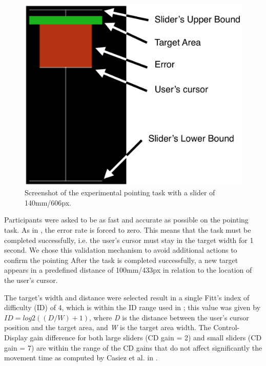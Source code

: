 \documentclass{sigchi}
\begin{document}
\begin{figure}[h]
\centering
  \includegraphics[width=0.7\columnwidth]{figures/slidertask}
  \caption{Screenshot of the experimental pointing task with a slider of 140mm/606px.}
  \label{fig:figure4}
\end{figure}

Participants were asked to be as fast and accurate as possible on the pointing task. As in \cite{Coutrix2015}, the error rate is forced to zero. This means that the task must be completed successfully, i.e. the user’s cursor must stay in the target width for 1 second. We chose this validation mechanism to avoid additional actions to confirm the pointing \cite{Zhang:2012:MDE:2212776.2223704} After the task is completed successfully, a new target appears in a predefined distance of 100mm/433px in relation to the location of the user’s cursor.

The target’s width and distance were selected result in a single Fitt’s index of difficulty  (ID) of 4, which is within the ID range used in \cite{Casiez08theimpact}; this value was given by $ID = log2((D/W)+1)$, where \textit{D} is the distance between the user’s cursor position and the target area, and \textit{W} is the target area width. The Control-Display gain difference for both large sliders (CD gain = 2) and small sliders (CD gain = 7) are within the range of the CD gains that do not affect significantly the movement time as computed by Casiez et al. in \cite{Casiez08theimpact}.

\end{document}
